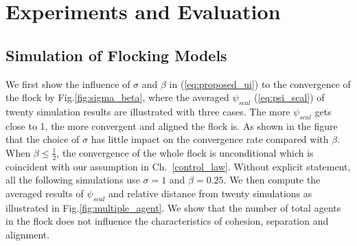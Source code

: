 \chapter{Experiments and Evaluation}\label{experiment}

\section{Simulation of Flocking Models}

We first show the influence of $\sigma$ and $\beta$ in (\ref{eq:proposed_ui}) to the convergence of the flock by Fig.\ref{fig:sigma_beta}, where the averaged $\psi_{scal}$ (\ref{eq:psi_scal}) of twenty simulation results are illustrated with three cases. The more $\psi_{scal}$ gets close to 1, the more convergent and aligned the flock is. As shown in the figure that the choice of $\sigma$ has little impact on the convergence rate compared with $\beta$. When $\beta\leq\frac{1}{2}$, the convergence of the whole flock is unconditional which is coincident with our assumption in Ch.~\ref{control_law}. Without explicit statement, all the following simulations use $\sigma=1$ and $\beta=0.25$. We then compute the averaged results of $\psi_{scal}$ and relative distance from twenty simulations as illustrated in Fig.\ref{fig:multiple_agent}. We show that the number of total agents in the flock does not influence the characteristics of cohesion, separation and alignment.

